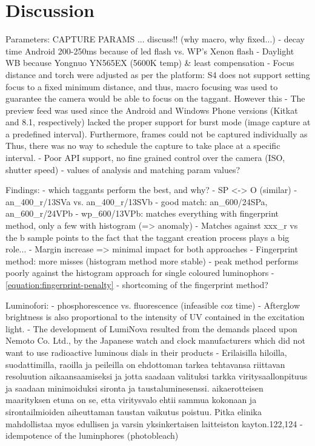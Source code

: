 \documentclass[thesis.tex]{subfiles}
\begin{document}
\chapter{Discussion}
\label{chapter:discussion}

Parameters:
CAPTURE PARAMS ... discuss!! (why macro, why fixed...)
- decay time Android 200-250ms because of led flash vs. WP's Xenon flash
- Daylight WB because Yongnuo YN565EX (5600K temp) \& least compensation
- Focus distance and torch were adjusted as per the platform: S4 does not support setting focus to a fixed minimum distance, and thus, macro focusing was used to guarantee the camera would be able to focus on the taggant. However this
- The preview feed was used since the Android and Windows Phone versions (Kitkat and 8.1, respectively) lacked the proper support for burst mode (image capture at a predefined interval). Furthermore, frames could not be captured individually as Thus, there was no way to schedule the capture to take place at a specific interval.
- Poor API support, no fine grained control over the camera (ISO, shutter speed)
- values of analysis and matching param values?

Findings:
- which taggants perform the best, and why?
- SP <-> O (similar)
- an\_400\_r/13SVa vs. an\_400\_r/13SVb
- good match: an\_600/24SPa, an\_600\_r/24VPb
- wp\_600/13VPb: matches everything with fingerprint method, only a few with histogram (=> anomaly)
- Matches against xxx\_r vs the b sample points to the fact that the taggant creation process plays a big role...
- Margin increase => minimal impact for both approaches
- Fingerprint method: more misses (histogram method more stable)
- peak method performs poorly against the histogram approach for single coloured luminophors
- \ref{equation:fingerprint-penalty} - shortcoming of the fingerprint method?

Luminofori:
- phosphorescence vs. fluorescence (infeasible coz time)
- Afterglow brightness is also proportional to the intensity of UV contained in the excitation light.
- The development of LumiNova resulted from the demands placed upon Nemoto  Co. Ltd.,  by the Japanese watch and clock manufacturers which did not want to use radioactive luminous dials in their products
- Erilaisilla hiloilla, suodattimilla, raoilla ja peileilla on ehdottoman tarkea tehtavansa riittavan resoluution aikaansaamiseksi ja jotta saadaan valituksi tarkka viritysaallonpituus ja saadaan minimoiduksi sironta ja taustaluminesenssi. aikaerotteisen maarityksen etuna on se, etta viritysvalo ehtii sammua kokonaan ja sirontailmioiden aiheuttaman taustan vaikutus poistuu. Pitka elinika mahdollistaa myos edullisen ja varsin yksinkertaisen laitteiston kayton.122,124
- idempotence of the luminphores (photobleach)
\end{document}
